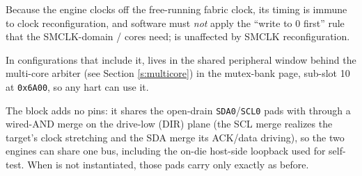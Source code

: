 Because the engine clocks off the free-running fabric clock, its timing is immune to clock reconfiguration, and software must \emph{not} apply the ``write  to 0 first'' rule that the SMCLK-domain / cores need;  is unaffected by SMCLK reconfiguration.

In configurations that include it,  lives in the shared peripheral window behind the multi-core arbiter (see Section \ref{s:multicore}) in the mutex-bank page, sub-slot 10 at \texttt{0x6A00}, so any hart can use it.

The block adds no pins: it shares the open-drain \texttt{SDA0}/\texttt{SCL0} pads with  through a wired-AND merge on the drive-low (DIR) plane (the SCL merge realizes the target's clock stretching and the SDA merge its ACK/data driving), so the two engines can share one bus, including the on-die host-side loopback used for self-test. When  is not instantiated, those pads carry only  exactly as before.
